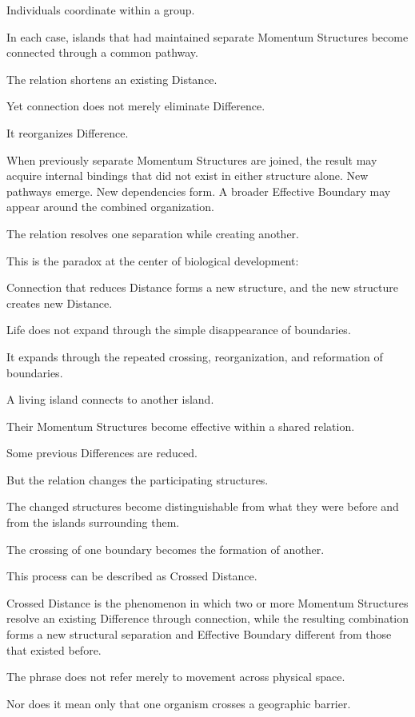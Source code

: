 Individuals coordinate within a group.

In each case, islands that had maintained separate Momentum Structures become connected through a common pathway.

The relation shortens an existing Distance.

Yet connection does not merely eliminate Difference.

It reorganizes Difference.

When previously separate Momentum Structures are joined, the result may acquire internal bindings that did not exist in either structure alone. New pathways emerge. New dependencies form. A broader Effective Boundary may appear around the combined organization.

The relation resolves one separation while creating another.

This is the paradox at the center of biological development:

Connection that reduces Distance forms a new structure, and the new structure creates new Distance.

Life does not expand through the simple disappearance of boundaries.

It expands through the repeated crossing, reorganization, and reformation of boundaries.

A living island connects to another island.

Their Momentum Structures become effective within a shared relation.

Some previous Differences are reduced.

But the relation changes the participating structures.

The changed structures become distinguishable from what they were before and from the islands surrounding them.

The crossing of one boundary becomes the formation of another.

This process can be described as Crossed Distance.

Crossed Distance is the phenomenon in which two or more Momentum Structures resolve an existing Difference through connection, while the resulting combination forms a new structural separation and Effective Boundary different from those that existed before.

The phrase does not refer merely to movement across physical space.

Nor does it mean only that one organism crosses a geographic barrier.

